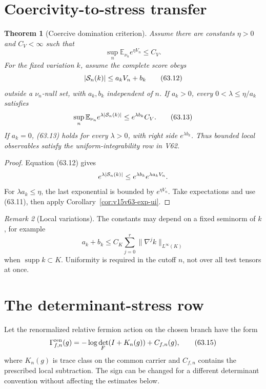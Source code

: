 \documentclass[11pt]{article}
\newtheorem{theorem}{Theorem}[section]
\theoremstyle{remark}
\newtheorem{remark}[theorem]{Remark}
\begin{document}
\section{Coercivity-to-stress transfer}

\begin{theorem}[Coercive domination criterion]
\label{thm:v15v63-coercive-score}
Assume there are constants \(\eta>0\) and \(C_V<\infty\) such that
\[
 \sup_n\mathbb E_{\nu_n}e^{\eta V_n}\leq C_V.          \tag{63.11}
\]
For the fixed variation \(k\), assume the complete score obeys
\[
 |{\cal S}_n(k)|\leq a_kV_n+b_k                       \tag{63.12}
\]
outside a \(\nu_n\)-null set, with \(a_k,b_k\) independent of
\(n\).  If \(a_k>0\), every
\(0<\lambda\leq\eta/a_k\) satisfies
\[
 \sup_n\mathbb E_{\nu_n}e^{\lambda|{\cal S}_n(k)|}
 \leq e^{\lambda b_k}C_V.                             \tag{63.13}
\]
If \(a_k=0\), (63.13) holds for every \(\lambda>0\), with right
side \(e^{\lambda b_k}\).  Thus bounded local observables satisfy
the uniform-integrability row in V62.
\end{theorem}

\begin{proof}
Equation (63.12) gives
\[
 e^{\lambda|{\cal S}_n(k)|}
 \leq e^{\lambda b_k}e^{\lambda a_kV_n}.
\]
For \(\lambda a_k\leq\eta\), the last exponential is bounded by
\(e^{\eta V_n}\).  Take expectations and use (63.11), then apply
Corollary~\ref{cor:v15v63-exp-ui}.
\end{proof}

\begin{remark}[Local variations]
\label{rem:v15v63-local}
The constants may depend on a fixed seminorm of \(k\), for example
\[
 a_k+b_k
 \leq C_K\sum_{j=0}^{r}\|\nabla^jk\|_{L^\infty(K)}
                                                               \tag{63.14}
\]
when \(\operatorname{supp}k\subset K\).  Uniformity is required in
the cutoff \(n\), not over all test tensors at once.
\end{remark}

\section{The determinant-stress row}

Let the renormalized relative fermion action on the chosen branch
have the form
\[
 \Gamma^{\rm ren}_{f,n}(g)
 =
 -\log\det_{\!F}(I+K_n(g))+C_{f,n}(g),                 \tag{63.15}
\]
where \(K_n(g)\) is trace class on the common carrier and
\(C_{f,n}\) contains the prescribed local subtraction.  The sign
can be changed for a different determinant convention without
affecting the estimates below.
\end{document}
